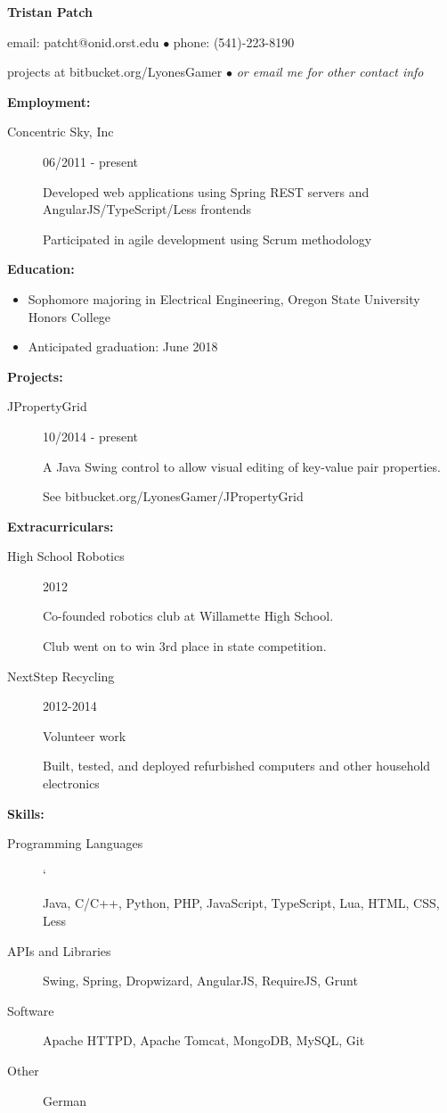 \documentclass[11pt]{article}
\begin{document}
\centerline{{\LARGE \bf Tristan Patch}}
\bigskip
\centerline{email: patcht@onid.orst.edu
$\bullet$
phone: (541)-223-8190}
\centerline{projects at bitbucket.org/LyonesGamer
$\bullet$
\emph{or email me for other contact info}}
\bigskip
\hrulefill
\bigskip
{\Large \bf Employment:}
\begin{description}
\item[Concentric Sky, Inc]
\hfill 06/2011 - present

Developed web applications using Spring REST servers and AngularJS/TypeScript/Less frontends

Participated in agile development using Scrum methodology
\end{description}
\smallskip
\hrulefill
\bigskip
{\Large \bf Education:}
\begin{itemize}
\setlength{\itemsep}{1pt}
\setlength{\parskip}{0pt}
\setlength{\parsep}{0pt}
\item Sophomore majoring in Electrical Engineering, Oregon State University
Honors College
\item Anticipated graduation: June 2018
\end{itemize}
\smallskip
\hrulefill
\bigskip
{\Large \bf Projects:}
\begin{description}
\item[JPropertyGrid]
\hfill 10/2014 - present

A Java Swing control to allow visual editing of key-value pair properties.

See bitbucket.org/LyonesGamer/JPropertyGrid
\end{description}
\smallskip
\hrulefill
\bigskip
{\Large \bf Extracurriculars:}
\begin{description}
\item[High School Robotics]
\hfill 2012

Co-founded robotics club at Willamette High School.

Club went on to win 3rd place in state competition.

\item[NextStep Recycling]
\hfill 2012-2014

Volunteer work

Built, tested, and deployed refurbished computers and other household electronics
\end{description}
\smallskip
\hrulefill
\bigskip
{\Large \bf Skills:}
\begin{description}
\item[Programming Languages]
\hfill`

Java, C/C++, Python, PHP, JavaScript, TypeScript, Lua, HTML, CSS, Less

\item[APIs and Libraries]
\hfill

Swing, Spring, Dropwizard, AngularJS, RequireJS, Grunt

\item[Software]
\hfill

Apache HTTPD, Apache Tomcat, MongoDB, MySQL, Git

\item[Other]
\hfill

German
\end{description}
\end{document}
